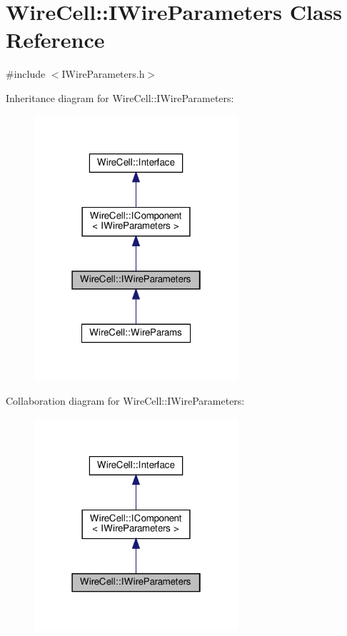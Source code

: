 \hypertarget{class_wire_cell_1_1_i_wire_parameters}{}\section{Wire\+Cell\+:\+:I\+Wire\+Parameters Class Reference}
\label{class_wire_cell_1_1_i_wire_parameters}


{\ttfamily \#include $<$I\+Wire\+Parameters.\+h$>$}



Inheritance diagram for Wire\+Cell\+:\+:I\+Wire\+Parameters\+:
\nopagebreak
\begin{figure}[H]
\begin{center}
\leavevmode
\includegraphics[width=214pt]{class_wire_cell_1_1_i_wire_parameters__inherit__graph}
\end{center}
\end{figure}


Collaboration diagram for Wire\+Cell\+:\+:I\+Wire\+Parameters\+:
\nopagebreak
\begin{figure}[H]
\begin{center}
\leavevmode
\includegraphics[width=214pt]{class_wire_cell_1_1_i_wire_parameters__coll__graph}
\end{center}
\end{figure}

